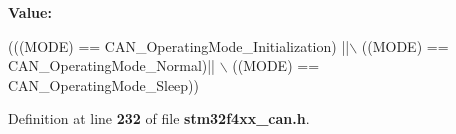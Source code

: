{\bfseries Value\+:}
\begin{DoxyCode}
(((MODE) == CAN_OperatingMode_Initialization) ||\(\backslash\)
                                    ((MODE) == CAN_OperatingMode_Normal)|| \(\backslash\)
                                                                        ((MODE) == 
      CAN_OperatingMode_Sleep))
\end{DoxyCode}


Definition at line \textbf{ 232} of file \textbf{ stm32f4xx\+\_\+can.\+h}.

